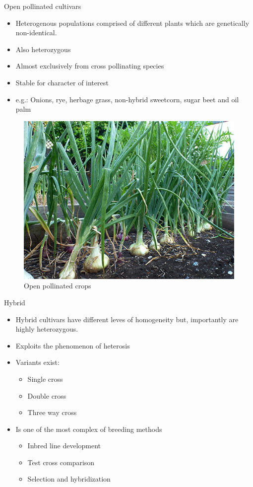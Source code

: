 \documentclass[11pt,ignorenonframetext,aspectratio=169]{beamer}
\providecommand{\tightlist}{%
  \setlength{\itemsep}{0pt}\setlength{\parskip}{0pt}}
\begin{document}
\begin{frame}{Open pollinated cultivars}
\protect\hypertarget{open-pollinated-cultivars}{}
\begin{itemize}
\tightlist
\item
  Heterogenous populations comprised of different plants which are
  genetically non-identical.
\item
  Also heterozygous
\item
  Almost exclusively from cross pollinating species
\item
  Stable for character of interest
\item
  e.g.: Onions, rye, herbage grass, non-hybrid sweetcorn, sugar beet and
  oil palm
\end{itemize}

\begin{figure}

{\centering \includegraphics[width=0.35\linewidth]{./images/open_pollinated_onion} 

}

\caption{Open pollinated crops}\label{fig:unnamed-chunk-1}
\end{figure}
\end{frame}

\begin{frame}{Hybrid}
\protect\hypertarget{hybrid}{}
\begin{itemize}
\tightlist
\item
  Hybrid cultivars have different leves of homogeneity but, importantly
  are highly heterozygous.
\item
  Exploits the phenomenon of heterosis
\item
  Variants exist:

  \begin{itemize}
  \tightlist
  \item
    Single cross
  \item
    Double cross
  \item
    Three way cross
  \end{itemize}
\item
  Is one of the most complex of breeding methods

  \begin{itemize}
  \tightlist
  \item
    Inbred line development
  \item
    Test cross comparison
  \item
    Selection and hybridization
  \end{itemize}
\end{itemize}
\end{frame}
\end{document}
